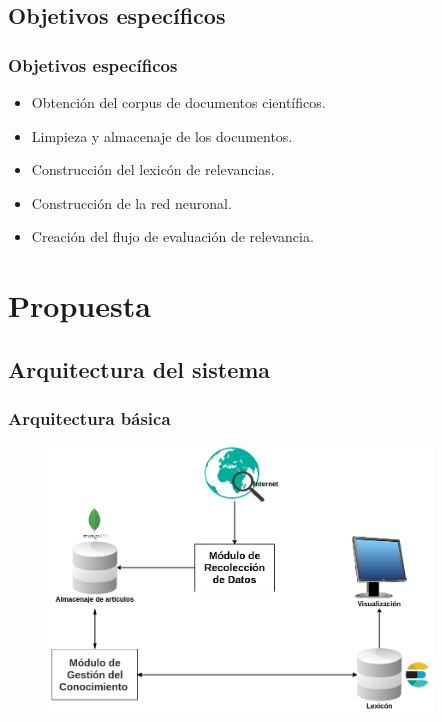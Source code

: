 \documentclass[10pt,fleqn]{beamer}
\begin{document}
\subsection{Objetivos específicos}
\begin{frame}\frametitle{Objetivos específicos} 
\begin{itemize}
\item Obtención del corpus de documentos científicos. 
\item Limpieza y almacenaje de los documentos.
\item Construcción del lexicón de relevancias.
\item Construcción de la red neuronal.
\item Creación del flujo de evaluación de relevancia.
\end{itemize}
\end{frame}


\section{Propuesta}
\subsection{Arquitectura del sistema}

\begin{frame}\frametitle{Arquitectura básica} 
\begin{figure}
  \centering
  \includegraphics[width=10.2cm, keepaspectratio]{arquitectura.png}
\end{figure}
\end{frame}
\end{document}
